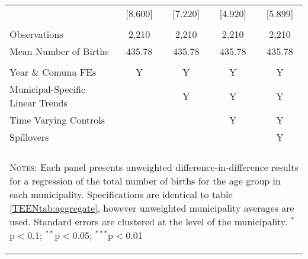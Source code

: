 \begin{table}[!htbp]
\begin{tabular}{@{\extracolsep{5pt}}lcccc}
            &[8.600]&[7.220]&[4.920]&[5.899]\\
 & & & & \\
Observations&2,210&2,210&2,210&2,210\\
Mean Number of Births&435.78&435.78&435.78&435.78\\
\hline \\[-1.8ex] 
{\small Year \& Comuna FEs}             &Y&Y&Y&Y \\
{\small Municipal-Specific Linear Trends}& &Y&Y&Y \\
{\small Time Varying Controls}           & & &Y&Y \\
{\small Spillovers}                      & & & &Y \\
\hline \hline \\[-1.8ex]
\multicolumn{5}{p{14.8cm}}{\begin{footnotesize}
\textsc{Notes:} Each panel presents unweighted       
difference-in-difference results for a regression of  
the total number of births for the age group in each  
 municipality. Specifications are identical to table  
\ref{TEENtab:aggregate}, however unweighted          
municipality averages are used. Standard errors are   
clustered at the level of the municipality.
$^{*}$p$<$0.1; $^{**}$p$<$0.05; $^{***}$p$<$0.01\end{footnotesize}}
\normalsize\end{tabular}\end{table}
